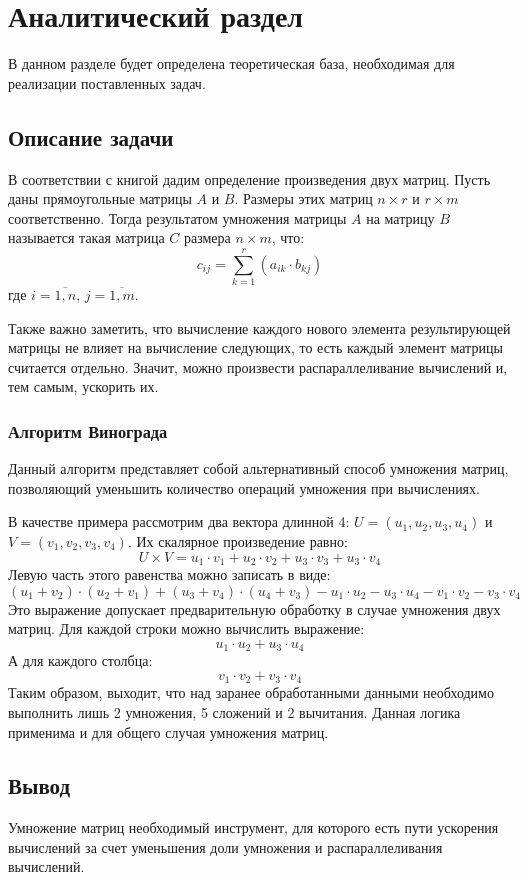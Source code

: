 \chapter{Аналитический раздел}
\label{cha:analysis}

В данном разделе будет определена теоретическая база, необходимая для реализации поставленных задач.

\section{Описание задачи}

В соответствии с книгой \cite{litr} дадим определение произведения двух матриц. Пусть даны прямоугольные матрицы $A$ и $B$. Размеры этих матриц $n\times{}r$ и $r\times{}m$ соответственно. Тогда результатом умножения матрицы $A$ на матрицу $B$ называется такая матрица $C$ размера $n\times{}m$, что:
\begin{equation}
    c_{ij} = \sum\limits_{k=1}^r(a_{ik}\cdot{}b_{kj})
\end{equation}
где $i = \overline{1, n}$, $j = \overline{1, m}$.

Также важно заметить, что вычисление каждого нового элемента результирующей матрицы не влияет на вычисление следующих, то есть каждый элемент матрицы считается отдельно. Значит, можно произвести распараллеливание вычислений и, тем самым, ускорить их.

\subsection{Алгоритм Винограда}
Данный алгоритм представляет собой альтернативный способ умножения матриц, позволяющий уменьшить количество операций умножения при вычислениях.

В качестве примера рассмотрим два вектора длинной 4: $U = (u_1, u_2, u_3, u_4)$ и $V = (v_1, v_2, v_3, v_4)$. Их скалярное произведение равно:
\begin{equation}
    U\times{}V = u_1\cdot{}v_1 + u_2\cdot{}v_2 + u_3\cdot{}v_3 + u_3\cdot{}v_4
\end{equation}
Левую часть этого равенства можно записать в виде:
\begin{equation}
    (u_1 + v_2)\cdot{}(u_2 + v_1) + (u_3 + v_4)\cdot{}(u_4 + v_3) - u_1\cdot{}u_2 - u_3\cdot{}u_4 - v_1\cdot{}v_2 - v_3\cdot{}v_4
\end{equation}
Это выражение допускает предварительную обработку в случае умножения двух матриц. Для каждой строки можно вычислить выражение:
\begin{equation}
    u_1\cdot{}u_2 + u_3\cdot{}u_4
\end{equation}
А для каждого столбца:
\begin{equation}
    v_1\cdot{}v_2 + v_3\cdot{}v_4
\end{equation}
Таким образом, выходит, что над заранее обработанными данными необходимо выполнить лишь 2 умножения, 5 сложений и 2 вычитания. Данная логика применима и для общего случая умножения матриц.

\section{Вывод}
Умножение матриц необходимый инструмент, для которого есть пути ускорения вычислений за счет уменьшения доли умножения и распараллеливания вычислений.

